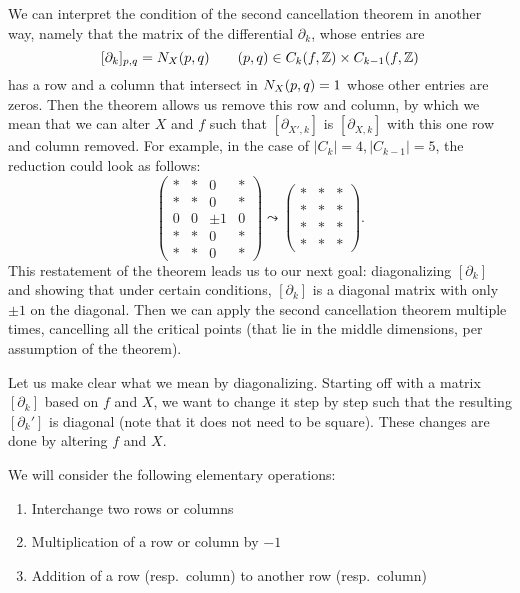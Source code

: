 We can interpret the condition of the second cancellation theorem in another way, namely that the matrix of the differential $\partial_k$, whose entries are \[
    [\partial_k]_{p, q} = N_{X}(p, q) \qquad (p,q) \in C_k(f, \mathbb{Z}) \times  C_{k-1}(f, \mathbb{Z})
\] has a row and a column that intersect in $N_{X}(p, q) = 1$ whose other entries are zeros. Then the theorem allows us remove this row and column, by which we mean that we can alter $X$ and $f$ such that $[\partial_{X', k}]$ is $[\partial_{X, k}]$ with this one row and column removed.
For example, in the case of $|C_k| = 4, |C_{k-1}| = 5$, the reduction could look as follows:
\[
    \begin{pmatrix}
        * & *&0 & *\\
        * & *&0 & *\\
        0 & 0&\pm 1 & 0 \\
        * & *&0 & *\\
        * & *&0 & *
    \end{pmatrix}
\leadsto
\begin{pmatrix}
    * & *& *\\
    * & *& *\\
    * & *& *\\
    * & *& *
\end{pmatrix}
.\] 
This restatement of the theorem leads us to our next goal: diagonalizing $[\partial_k]$ and showing that under certain conditions,  $[\partial_k]$ is a diagonal matrix with only $\pm 1$ on the diagonal. Then we can apply the second cancellation theorem multiple times, cancelling all the critical points (that lie in the middle dimensions, per assumption of the theorem).

Let us make clear what we mean by diagonalizing.
Starting off with a matrix $[\partial_k]$ based on $f$ and $X$, we want to change it step by step such that the resulting $[\partial_k']$ is diagonal (note that it does not need to be square). These changes are done by altering $f$ and $X$.

We will consider the following elementary operations:
\begin{enumerate}[E1]
    \item Interchange two rows or columns
    \item Multiplication of a row or column by $-1$
    \item Addition of a row (resp.~column) to another row (resp.~column)
\end{enumerate}

